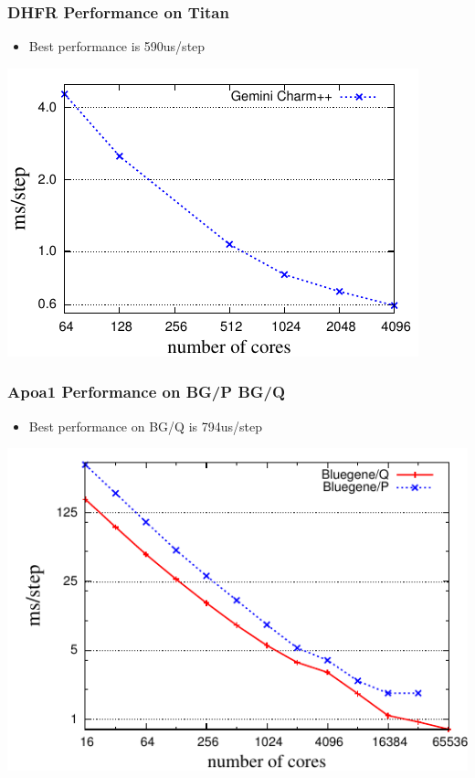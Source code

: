 \begin{frame}[t]
\frametitle{DHFR Performance on Titan}
  \begin{itemize}
  \item Best performance is 590us/step
  \end{itemize}
  \begin{center} \includegraphics[width=.8\textwidth]{figures/jac-titan-pme4.pdf} \end{center}
\end{frame}

\begin{frame}[t]
\frametitle{Apoa1 Performance on BG/P BG/Q}
  \begin{itemize}
  \item Best performance on BG/Q is 794us/step
  \end{itemize}
  \begin{center} \includegraphics[width=.8\textwidth]{figures/apoa1-pme4-PQ.pdf} \end{center}
\end{frame}

